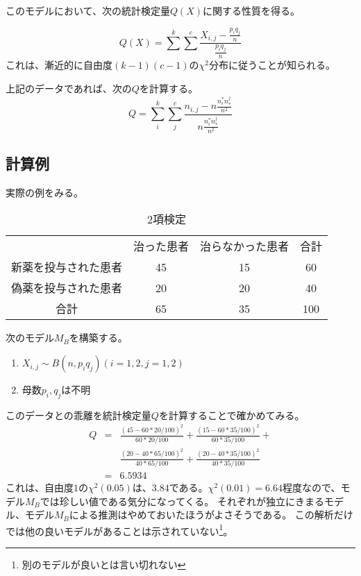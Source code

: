 このモデルにおいて、次の統計検定量$Q(X)$に関する性質を得る。

\begin{equation*}
 Q(X) = \sum^k \sum^c \frac{ X_{i,j} - \frac{p_i q_j}{n}}{\frac{p_i q_j}{n} }
\end{equation*}
これは、漸近的に自由度$(k-1)(c-1)$の$\chi^2$分布に従うことが知られる。

上記のデータであれば、次の$Q$を計算する。
\begin{equation*}
 Q = \sum_i^k \sum_j^c \frac{ n_{i,j} - n\frac{n_i^* n_*^j}{n^2}}{n\frac{n_i^* n_*^j}{n^2} }
\end{equation*}




\subsection{計算例}
実際の例をみる。

\begin{table}[hbtp]
 \caption{2項検定}
\begin{tabular}{c|cc|c}
 & 治った患者 & 治らなかった患者 & 合計 \\
 新薬を投与された患者&45 & 15& 60  \\
 偽薬を投与された患者&20 & 20 & 40 \\
 合計 & 65& 35& 100
\end{tabular}
\end{table}

次のモデル$M_B$を構築する。
\begin{enumerate}
 \item $X_{i,j} \sim B(n,p_i q_j) (i=1,2,j=1,2)$
 \item 母数$p_i,q_j$は不明
\end{enumerate}
このデータとの乖離を統計検定量$Q$を計算することで確かめてみる。
\begin{eqnarray*}
 Q &=& \frac{(45-60*20/100)^2}{60*20/100} +\frac{(15-60*35/100)^2}{60*35/100} + \\
&&\frac{(20-40*65/100)^2}{40*65/100} + 
\frac{(20-40*35/100)^2}{40*35/100} \\
&=& 6.5934
\end{eqnarray*}
これは、自由度$1$の$\chi^2(0.05)$は、$3.84$である。$\chi^2(0.01)=6.64$程度なので、モデル$M_B$では珍しい値である気分になってくる。
それぞれが独立にきまるモデル、モデル$M_B$による推測はやめておいたほうがよさそうである。
この解析だけでは他の良いモデルがあることは示されていない\footnote{別のモデルが良いとは言い切れない}。

